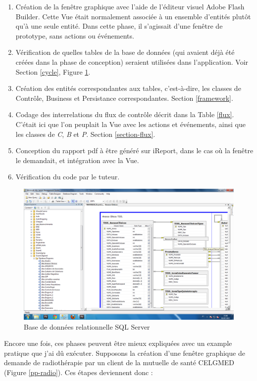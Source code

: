 \begin{enumerate}
\item Création de la fenêtre graphique avec l'aide de l'éditeur visuel Adobe Flash Builder. Cette Vue était normalement associée à un ensemble d'entités plutôt qu'à une seule entité. Dans cette phase, il s'agissait d'une fenêtre de prototype, sans actions ou événements.
\item Vérification de quelles tables de la base de données (qui avaient déjà été créées dans la phase de conception) seraient utilisées dans l'application. Voir Section \ref{cycle}, Figure \ref{db}.
\item Création des entités correspondantes aux tables, c'est-à-dire, les classes de Contrôle, Business et Persistance correspondantes. Section \ref{framework}.
\item Codage des interrelations du flux de contrôle décrit dans la Table \ref{flux}. C'était ici que l'on peuplait la Vue avec les actions et événements, ainsi que les classes de \textit{C}, \textit{B} et \textit{P}. Section \ref{section-flux}.
\item Conception du rapport pdf à être généré sur iReport, dans le cas où la fenêtre le demandait, et intégration avec la Vue.
\item Vérification du code par le tuteur.
\end{enumerate}

\begin{figure}[h]
\begin{center}
    \includegraphics[scale=0.39]{img/db}
    \caption{Base de données relationnelle SQL Server}
	\label{db}
\end{center}
\end{figure}

Encore une fois, ces phases peuvent être mieux expliquées avec un example pratique que j'ai dû exécuter. Supposons la création d'une fenêtre graphique de demande de radiothérapie par un client de la mutuelle de santé CELGMED (Figure \ref{pp-radio}). Ces étapes deviennent donc :


